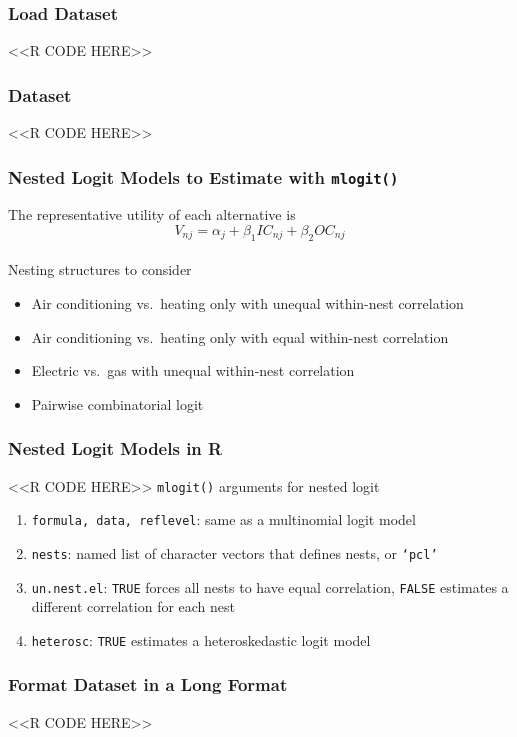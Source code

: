 \documentclass{beamer}
\begin{document}
\begin{frame}[fragile]\frametitle{Load Dataset}
    <<R CODE HERE>>
\end{frame}

\begin{frame}[fragile]\frametitle{Dataset}
    <<R CODE HERE>>
\end{frame}

\begin{frame}\frametitle{Nested Logit Models to Estimate with \texttt{mlogit()}}
    The representative utility of each alternative is
    $$V_{nj} = \alpha_j + \beta_1 IC_{nj} + \beta_2 OC_{nj}$$ \\
    \vspace{3ex}
    Nesting structures to consider
    \begin{itemize}
    	\item Air conditioning vs.\ heating only with unequal within-nest correlation
    	\item Air conditioning vs.\ heating only with equal within-nest correlation
    	\item Electric vs.\ gas with unequal within-nest correlation
    	\item Pairwise combinatorial logit 
    \end{itemize}
\end{frame}

\begin{frame}[fragile]\frametitle{Nested Logit Models in R}
    <<R CODE HERE>>
    \vspace{2ex}
    \texttt{mlogit()} arguments for nested logit
    \begin{enumerate}
        \item \texttt{formula, data, reflevel}: same as a multinomial logit model
        \item \texttt{nests}: named list of character vectors that defines nests, or \texttt{`pcl'}
        \item \texttt{un.nest.el}: \texttt{TRUE} forces all nests to have equal correlation, \texttt{FALSE} estimates a different correlation for each nest
        \item \texttt{heterosc}: \texttt{TRUE} estimates a heteroskedastic logit model
    \end{enumerate}
\end{frame}

\begin{frame}[fragile]\frametitle{Format Dataset in a Long Format}
    <<R CODE HERE>>
\end{frame}
\end{document}
